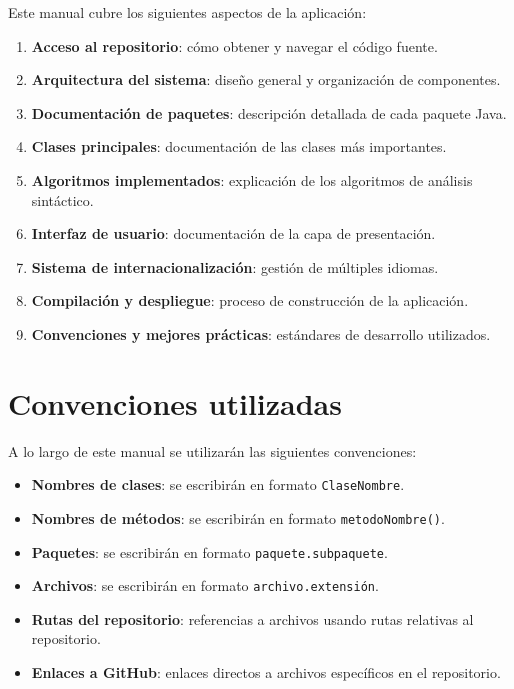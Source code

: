 Este manual cubre los siguientes aspectos de la aplicación:

\begin{enumerate}
    \item \textbf{Acceso al repositorio}: cómo obtener y navegar el código fuente.
    \item \textbf{Arquitectura del sistema}: diseño general y organización de componentes.
    \item \textbf{Documentación de paquetes}: descripción detallada de cada paquete Java.
    \item \textbf{Clases principales}: documentación de las clases más importantes.
    \item \textbf{Algoritmos implementados}: explicación de los algoritmos de análisis sintáctico.
    \item \textbf{Interfaz de usuario}: documentación de la capa de presentación.
    \item \textbf{Sistema de internacionalización}: gestión de múltiples idiomas.
    \item \textbf{Compilación y despliegue}: proceso de construcción de la aplicación.
    \item \textbf{Convenciones y mejores prácticas}: estándares de desarrollo utilizados.
\end{enumerate}

\section{Convenciones utilizadas}

A lo largo de este manual se utilizarán las siguientes convenciones:

\begin{itemize}
    \item \textbf{Nombres de clases}: se escribirán en formato \texttt{ClaseNombre}.
    \item \textbf{Nombres de métodos}: se escribirán en formato \texttt{metodoNombre()}.
    \item \textbf{Paquetes}: se escribirán en formato \texttt{paquete.subpaquete}.
    \item \textbf{Archivos}: se escribirán en formato \texttt{archivo.extensión}.
    \item \textbf{Rutas del repositorio}: referencias a archivos usando rutas relativas al repositorio.
    \item \textbf{Enlaces a GitHub}: enlaces directos a archivos específicos en el repositorio.
\end{itemize}


